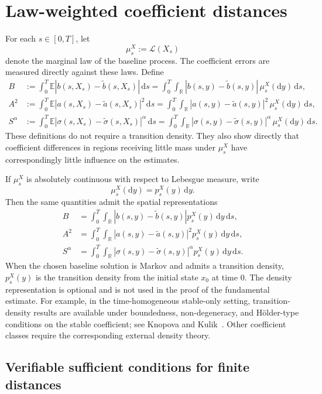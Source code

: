 \documentclass[11pt]{article}
\newcommand{\R}{\mathbb{R}}
\newcommand{\E}{\mathbb{E}}
\newcommand{\1}{\mathbf{1}}
\newcommand{\dd}{\,\mathrm{d}}
\newcommand{\md}{\mathrm{d}}
\newcommand{\wt}{\tilde}
\begin{document}
\section{Law-weighted coefficient distances}
\label{sec:distances}

For each $s\in[0,T]$, let
\[
  \mu_s^X:=\mathcal L(X_s)
\]
denote the marginal law of the baseline process. The coefficient errors are measured directly against these laws. Define
\begin{align}
B&:=\int_0^T\E |b(s,X_s)-\wt b(s,X_s)|\dd s
  =\int_0^T\int_\R |b(s,y)-\wt b(s,y)|\,\mu_s^X(\md y)\dd s, \label{eq:B-exp}\\
A^2&:=\int_0^T\E |a(s,X_s)-\wt a(s,X_s)|^2\dd s
  =\int_0^T\int_\R |a(s,y)-\wt a(s,y)|^2\,\mu_s^X(\md y)\dd s, \label{eq:A-exp}\\
S^\alpha&:=\int_0^T\E |\sigma(s,X_s)-\wt\sigma(s,X_s)|^\alpha\dd s
  =\int_0^T\int_\R |\sigma(s,y)-\wt\sigma(s,y)|^\alpha\,\mu_s^X(\md y)\dd s. \label{eq:S-exp}
\end{align}
These definitions do not require a transition density. They also show directly that coefficient differences in regions receiving little mass under $\mu_s^X$ have correspondingly little influence on the estimates.

If $\mu_s^X$ is absolutely continuous with respect to Lebesgue measure, write
\[
  \mu_s^X(\md y)=p_s^X(y)\,\md y.
\]
Then the same quantities admit the spatial representations
\begin{align}
B&=\int_0^T\int_\R |b(s,y)-\wt b(s,y)|p_s^X(y)\dd y\dd s, \label{eq:B-density}\\
A^2&=\int_0^T\int_\R |a(s,y)-\wt a(s,y)|^2p_s^X(y)\dd y\dd s, \label{eq:A-density}\\
S^\alpha&=\int_0^T\int_\R |\sigma(s,y)-\wt\sigma(s,y)|^\alpha p_s^X(y)\dd y\dd s. \label{eq:S-density}
\end{align}
When the chosen baseline solution is Markov and admits a transition density, $p_s^X(y)$ is the transition density from the initial state $x_0$ at time $0$. The density representation is optional and is not used in the proof of the fundamental estimate. For example, in the time-homogeneous stable-only setting, transition-density results are available under boundedness, non-degeneracy, and H\"older-type conditions on the stable coefficient; see Knopova and Kulik~\cite{KnopovaKulik2018}. Other coefficient classes require the corresponding external density theory.

\subsection{Verifiable sufficient conditions for finite distances}
\label{subsec:finite-distances}
\end{document}
